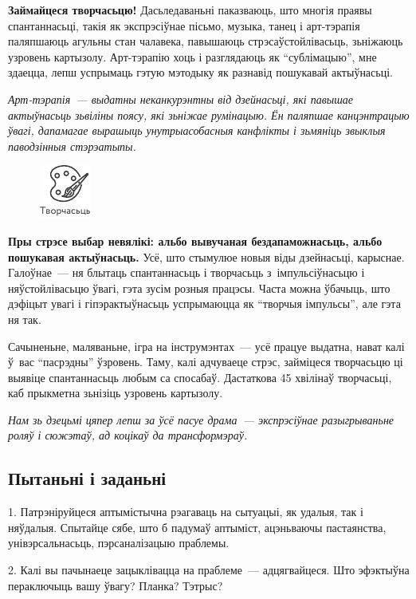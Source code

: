 \textbf{Займайцеся творчасьцю!} Дасьледаваньні паказваюць, што многія праявы спантаннасьці, такія як экспрэсіўнае пісьмо, музыка, танец і арт-тэрапія паляпшаюць агульны стан чалавека, павышаюць стрэсаўстойлівасьць, зьніжаюць узровень картызолу. Арт-тэ\-ра\-пію хоць і разглядаюць як ``сублімацыю'', мне здаецца, лепш успрымаць гэтую мэтодыку як разнавід пошукавай актыўнасьці.

\emph{Арт-тэрапія~--- выдатны неканкурэнтны від дзейнасьці, які павышае актыўнасьць зьвіліны поясу, які зьніжае румінацыю. Ён паляпшае канцэнтрацыю ўвагі, дапамагае вырашыць унутрыасобасныя канфлікты і зьмяніць звыклыя паводзінныя стэрэатыпы.}

\begin{figure}[htb!]
  \centering
  \includegraphics[scale=1.5]{willpower/ch7/18.pdf}
\end{figure}

\textbf{Пры стрэсе выбар невялікі: альбо вывучаная бездапаможнасьць, альбо пошукавая актыўнасьць.} Усё, што стымулюе новыя віды дзейнасьці, карыснае. Галоўнае~--- ня блытаць спантаннасьць і творчасьць з~імпульсіўнасьцю і няўстойлівасьцю ўвагі, гэта зусім розныя працэсы. Часта можна ўбачыць, што дэфіцыт увагі і гіпэрактыўнасьць успрымаюцца як ``творчыя імпульсы'', але гэта ня так.

Сачыненьне, маляваньне, ігра на інструмэнтах~--- усё працуе выдатна, нават калі ў~вас ``пасрэдны'' ўзровень. Таму, калі адчуваеце стрэс, займіцеся творчасьцю ці выявіце спантаннасьць любым са спосабаў. Дастаткова 45 хвілінаў творчасьці, каб прыкметна зьнізіць узровень картызолу. 

\emph{Нам зь дзецьмі цяпер лепш за ўсё пасуе драма~--- экспрэсіўнае разыгрываньне роляў і сюжэтаў, ад коцікаў да трансформэраў.}

\subsection*{Пытаньні і заданьні}

1. Патрэніруйцеся аптымістычна рэагаваць на сытуацыі, як удалыя, так і няўдалыя. Спытайце сябе, што б падумаў аптыміст, ацэньваючы пастаянства, унівэрсальнасьць, пэрсаналізацыю праблемы.

2. Калі вы пачынаеце зацыклівацца на праблеме~--- адцягвайцеся. Што эфэктыўна пераключыць вашу ўвагу? Планка? Тэтрыс?


